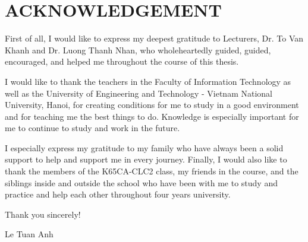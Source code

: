 \chapter*{ACKNOWLEDGEMENT}
\fontsize{13}{15}\selectfont

First of all, I would like to express my deepest gratitude to Lecturers, Dr. To Van Khanh and Dr. Luong Thanh Nhan, who wholeheartedly guided, guided, encouraged, and helped me throughout the course of this thesis.

I would like to thank the teachers in the Faculty of Information Technology as well as the University of Engineering and Technology - Vietnam National University, Hanoi, for creating conditions for me to study in a good environment and for teaching me the best things to do. Knowledge is especially important for me to continue to study and work in the future.

I especially express my gratitude to my family who have always been a solid support to help and support me in every journey.
Finally, I would also like to thank the members of the K65CA-CLC2 class, my friends in the course, and the siblings inside and outside the school who have been with me to study and practice and help each other throughout four years university.

Thank you sincerely!


\vspace{2cm}
\begin{flushright}
    Le Tuan Anh\hspace*{1.3cm}
\end{flushright}